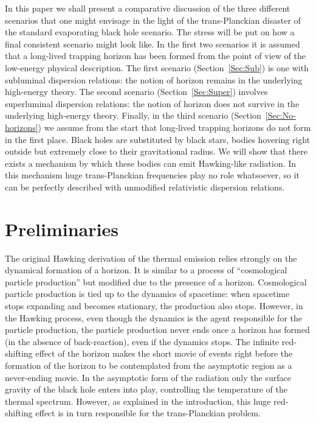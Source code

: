 \documentclass[11pt,a4paper]{article}
\begin{document}
In this paper we shall present a comparative discussion of the three different
scenarios that one might envisage in the light of the trans-Planckian disaster
of the standard evaporating black hole scenario. The stress will be put on how a
final consistent scenario might look like. In the first two scenarios it is assumed that a long-lived trapping horizon has been formed from the point of view of 
the low-energy physical description. The first scenario
(Section~\ref{Sec:Sub}) is one with subluminal dispersion relations: the
notion of horizon remains in the underlying high-energy theory.
The second scenario (Section~\ref{Sec:Super}) involves superluminal
dispersion relations: the notion of horizon does not survive in the underlying high-energy theory. Finally, in the third scenario (Section~\ref{Sec:No-horizons}) we 
assume from the start that long-lived trapping horizons do not form in the first 
place. Black holes are substituted by black stars, bodies hovering right outside but extremely close to their gravitational radius. We will show that there exists a mechanism by which these bodies can emit Hawking-like radiation. In this mechanism huge trans-Planckian frequencies play no role whatsoever, so it can be perfectly described  
with unmodified relativistic dispersion relations. 



\section{Preliminaries}
\label{Sec:Preliminaries}


The original Hawking derivation of the thermal emission relies strongly on the
dynamical formation of a horizon. It is similar to a process of ``cosmological
particle production'' but modified due to the presence of a horizon.
Cosmological particle production  is tied up to the dynamics of 
spacetime: when  spacetime stops expanding and becomes stationary, the
production also stops. However, in the Hawking process, even though the dynamics is
the agent responsible for the particle production, the particle production never ends once a horizon has formed (in the absence of
back-reaction), even if the dynamics stops. The infinite red-shifting effect of the horizon makes the short movie of events right before the formation of the horizon to be contemplated  from the asymptotic region as a never-ending movie. In the asymptotic form of
the radiation only the surface gravity of the black hole enters into play,
controlling the temperature of the thermal spectrum. However, as explained in
the introduction, this huge red-shifting effect is in turn responsible for the
trans-Planckian problem.
\end{document}
